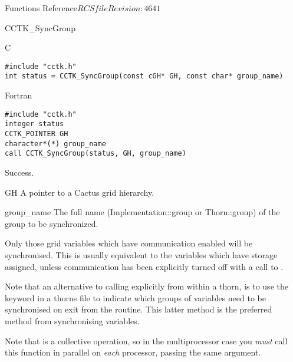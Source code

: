 \begin{cactuspart}{ Functions Reference}{$RCSfile$}{$Revision: 4641 $}
\begin{FunctionDescription}{CCTK\_SyncGroup}
\begin{SynopsisSection}
\begin{Synopsis}{C}
\begin{verbatim}
#include "cctk.h"
int status = CCTK_SyncGroup(const cGH* GH, const char* group_name)
\end{verbatim}
\end{Synopsis}
\begin{Synopsis}{Fortran}
\begin{verbatim}
#include "cctk.h"
integer status
CCTK_POINTER GH
character*(*) group_name
call CCTK_SyncGroup(status, GH, group_name)
\end{verbatim}
\end{Synopsis}
\end{SynopsisSection}

\begin{ResultSection}
\begin{Result}{0}
Success.
\end{Result}
\end{ResultSection}

\begin{ParameterSection}
\begin{Parameter}{GH}
A pointer to a Cactus grid hierarchy.
\end{Parameter}
\begin{Parameter}{group\_name}
The full name (Implementation::group or Thorn::group) of the group
to be synchronized.
\end{Parameter}
\end{ParameterSection}

\begin{Discussion}
Only those grid variables which have communication enabled
will be synchronised. This is usually equivalent to the variables
which have storage assigned, unless communication has been explicitly
turned off with a call to .

Note that an alternative to calling  explicitly
from within a thorn, is to use the  keyword in a thorns
 file to indicate which groups of variables need
to be synchronised on exit from the routine. This latter method is
the preferred method from synchronising variables.

Note that  is a collective operation, so in the
multiprocessor case you {\em must\/} call this function in parallel on
{\em each\/} processor, passing the same  argument.
\end{Discussion}


\end{FunctionDescription}
\end{cactuspart}
